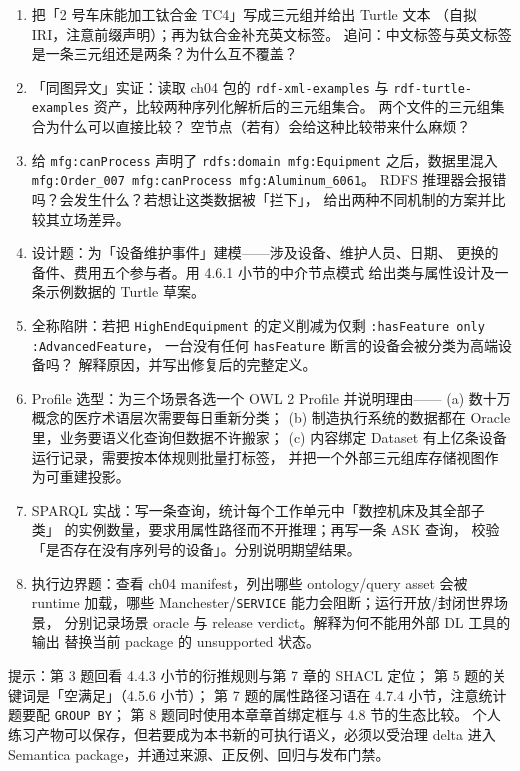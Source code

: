 \begin{enumerate}
  \item 把「2 号车床能加工钛合金 TC4」写成三元组并给出 Turtle 文本
        （自拟 IRI，注意前缀声明）；再为钛合金补充英文标签。
        追问：中文标签与英文标签是一条三元组还是两条？为什么互不覆盖？
  \item 「同图异文」实证：读取 ch04 包的 \texttt{rdf-xml-examples} 与
        \texttt{rdf-turtle-examples} 资产，比较两种序列化解析后的三元组集合。
        两个文件的三元组集合为什么可以直接比较？
        空节点（若有）会给这种比较带来什么麻烦？
  \item 给 \texttt{mfg:canProcess} 声明了 \texttt{rdfs:domain mfg:Equipment}
        之后，数据里混入 \texttt{mfg:Order\_007 mfg:canProcess mfg:Aluminum\_6061}。
        RDFS 推理器会报错吗？会发生什么？若想让这类数据被「拦下」，
        给出两种不同机制的方案并比较其立场差异。
  \item 设计题：为「设备维护事件」建模——涉及设备、维护人员、日期、
        更换的备件、费用五个参与者。用 4.6.1 小节的中介节点模式
        给出类与属性设计及一条示例数据的 Turtle 草案。
  \item 全称陷阱：若把 \texttt{HighEnd\allowbreak Equipment} 的定义削减为仅剩
        \texttt{:hasFeature only :Advanced\allowbreak Feature}，
        一台没有任何 \texttt{hasFeature} 断言的设备会被分类为高端设备吗？
        解释原因，并写出修复后的完整定义。
  \item Profile 选型：为三个场景各选一个 OWL 2 Profile 并说明理由——
        (a) 数十万概念的医疗术语层次需要每日重新分类；
        (b) 制造执行系统的数据都在 Oracle 里，业务要语义化查询但数据不许搬家；
        (c) 内容绑定 Dataset 有上亿条设备运行记录，需要按本体规则批量打标签，
        并把一个外部三元组库存储视图作为可重建投影。
  \item SPARQL 实战：写一条查询，统计每个工作单元中「数控机床及其全部子类」
        的实例数量，要求用属性路径而不开推理；再写一条 ASK 查询，
        校验「是否存在没有序列号的设备」。分别说明期望结果。
  \item 执行边界题：查看 ch04 manifest，列出哪些 ontology/query asset 会被 runtime
        加载，哪些 Manchester/\texttt{SERVICE} 能力会阻断；运行开放/封闭世界场景，
        分别记录场景 oracle 与 release verdict。解释为何不能用外部 DL 工具的输出
        替换当前 package 的 unsupported 状态。
\end{enumerate}

提示：第 3 题回看 4.4.3 小节的衍推规则与第 7 章的 SHACL 定位；
第 5 题的关键词是「空满足」（4.5.6 小节）；
第 7 题的属性路径习语在 4.7.4 小节，注意统计题要配 \texttt{GROUP BY}；
第 8 题同时使用本章章首绑定框与 4.8 节的生态比较。
个人练习产物可以保存，但若要成为本书新的可执行语义，必须以受治理 delta 进入
Semantica package，并通过来源、正反例、回归与发布门禁。

